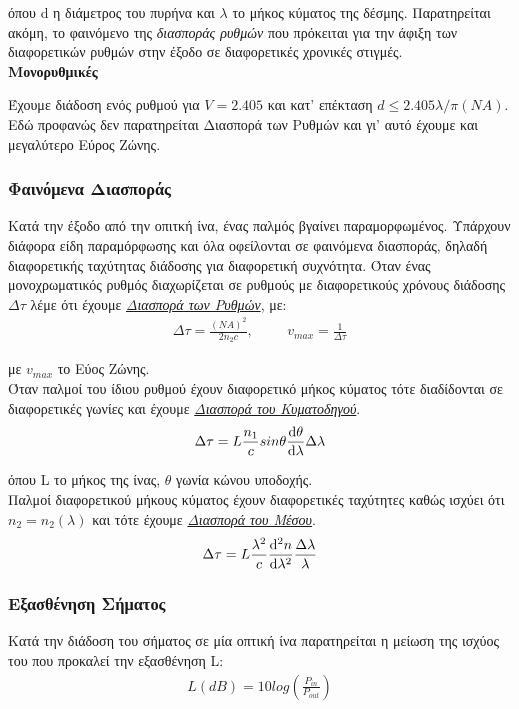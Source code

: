 \documentclass[a4paper]{article}
\begin{document}
			όπου d η διάμετρος του πυρήνα και $\lambda$ το μήκος κύματος της δέσμης. Παρατηρείται ακόμη, το φαινόμενο της \textit{διασποράς ρυθμών} που πρόκειται για την άφιξη των διαφορετικών ρυθμών στην έξοδο σε διαφορετικές χρονικές στιγμές.\\
					
		\textbf{Μονορυθμικές}
					
					Έχουμε διάδοση ενός ρυθμού για $V=2.405$ και κατ' επέκταση $d\leq2.405\lambda/\pi(NA)$. Εδώ προφανώς δεν παρατηρείται Διασπορά των Ρυθμών και γι' αυτό έχουμε και μεγαλύτερο Εύρος Ζώνης.
					
		\subsubsection*{Φαινόμενα Διασποράς}
			Κατά την έξοδο από την οπιτκή ίνα, ένας παλμός βγαίνει παραμορφωμένος. Υπάρχουν διάφορα είδη παραμόρφωσης και όλα οφείλονται σε φαινόμενα διασποράς, δηλαδή διαφορετικής ταχύτητας διάδοσης για διαφορετική συχνότητα. Όταν ένας μονοχρωματικός ρυθμός διαχωρίζεται σε ρυθμούς με διαφορετικούς χρόνους διάδοσης $\Delta \tau$ λέμε ότι έχουμε \underline{\textit{Διασπορά των Ρυθμών}}, με: 
			\begin{align*}
				\Delta \tau = \frac{(NA)^2}{2n_2c} , \hspace{1cm} v_{max} = \frac{1}{\Delta \tau}
			\end{align*}
			
			με $v_{max}$ το Εύος Ζώνης. \\ 
		Όταν παλμοί του ίδιου ρυθμού έχουν διαφορετικό μήκος κύματος τότε διαδίδονται σε διαφορετικές γωνίες και έχουμε \underline{\textit{Διασπορά του Κυματοδηγού}}. 
		\begin{align*}
			\Delta\tau = L\frac{n_1}{c}sin\theta\odv{\theta}{\lambda}\Delta\lambda
		\end{align*}
		
		όπου L το μήκος της ίνας, $\theta$ γωνία κώνου υποδοχής. \\ 
				Παλμοί διαφορετικού μήκους κύματος έχουν διαφορετικές ταχύτητες καθώς ισχύει ότι $n_2 = n_2(\lambda)$ και τότε έχουμε \underline{\textit{Διασπορά του Μέσου}}. 
		\begin{align*}
			\Delta\tau = L \frac{\lambda^2}{c} \odv[2]{n}{\lambda} \frac{\Delta\lambda}{\lambda}
		\end{align*}
		
		\subsubsection*{Εξασθένηση Σήματος}
			Κατά την διάδοση του σήματος σε μία οπτική ίνα παρατηρείται η μείωση της ισχύος του που προκαλεί την εξασθένηση L: 
			\begin{align*}
				L(dB) = 10log(\frac{P_{in}}{P_{out}})
			\end{align*}					
		
\end{document}
